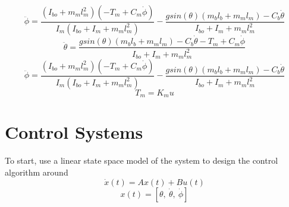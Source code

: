 \documentclass[12pt]{article}
\begin{document}
		\begin{equation}
			\ddot\phi = \frac{(I_{bo}+m_ml_m^2)(-T_m+C_m\dot\phi)}{I_m(I_{bo}+I_m+m_ml_m^2)} - \frac{gsin(\theta)(m_bl_b+m_ml_m)-C_b\dot\theta}{I_{bo}+I_m+m_ml_m^2}
		\end{equation}
		\begin{equation}
			\boxed{\ddot\theta = \frac{gsin(\theta)(m_bl_b + m_ml_m) - C_b \dot\theta - T_m + C_m \dot\phi}{I_{bo}+I_m+m_ml_m^2}}
		\end{equation}
		\begin{equation}
			\boxed{\ddot\phi = \frac{(I_{bo}+m_ml_m^2)(-T_m+C_m\dot\phi)}{I_m(I_{bo}+I_m+m_ml_m^2)} - \frac{gsin(\theta)(m_bl_b+m_ml_m)-C_b\dot\theta}{I_{bo}+I_m+m_ml_m^2}}
		\end{equation}
		\begin{equation}
			\boxed{T_m = K_m u}
		\end{equation}
	
	\section{Control Systems}
		To start, use a linear state space model of the system to design the control algorithm around
		\begin{equation}
			\dot x(t) = Ax(t) + Bu(t)
		\end{equation}
		\begin{equation}
			x(t) = [\theta,\ \dot\theta,\ \dot\phi]
		\end{equation}
\end{document}
